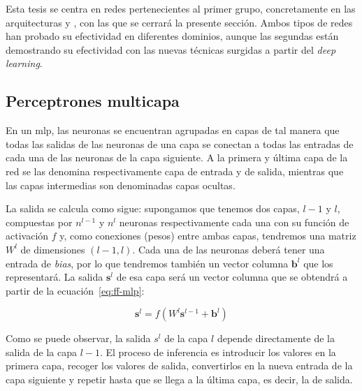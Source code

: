 Esta tesis se centra en redes pertenecientes al primer grupo, concretamente en las arquitecturas  y  , con las que se cerrará la presente sección. Ambos tipos de redes han probado su efectividad en diferentes dominios, aunque las segundas están demostrando su efectividad con las nuevas técnicas surgidas a partir del \textit{deep learning}.

\subsection{Perceptrones multicapa}
\label{ss:mlp}

En un \Acrfull{mlp}, las neuronas se encuentran agrupadas en capas de tal manera que todas las salidas de las neuronas de una capa se conectan a todas las entradas de cada una de las neuronas de la capa siguiente. A la primera y última capa de la red se las denomina respectivamente capa de entrada y de salida, mientras que las capas intermedias son denominadas capas ocultas.

La salida se calcula como sigue: supongamos que tenemos dos capas, $l-1$ y $l$, compuestas por $n^{l-1}$ y $n^l$ neuronas respectivamente cada una con su función de activación $f$ y, como conexiones (pesos) entre ambas capas, tendremos una matriz $W^l$ de dimensiones $(l-1, l)$. Cada una de las neuronas deberá tener una entrada de \textit{bias}, por lo que tendremos también un vector columna $\mathbf{b}^l$ que los representará. La salida $\mathbf{s}^l$ de esa capa será un vector columna que se obtendrá a partir de la ecuación~\ref{eq:ff-mlp}:

\begin{equation}
	\mathbf{s}^l = f(W^l \mathbf{s}^{l-1} + \mathbf{b}^l)
	\label{eq:ff-mlp}
\end{equation}

Como se puede observar, la salida $s^l$ de la capa $l$ depende directamente de la salida de la capa $l - 1$. El proceso de inferencia es introducir los valores en la primera capa, recoger los valores de salida, convertirlos en la nueva entrada de la capa siguiente y repetir hasta que se llega a la última capa, es decir, la de salida.

